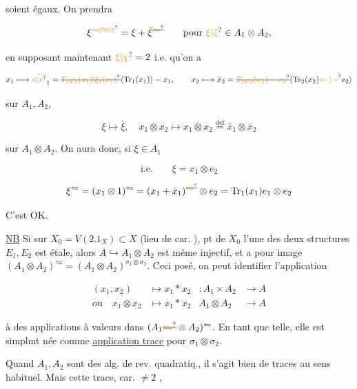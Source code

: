 soient égaux. On prendra



\[
\xi^{\unsure{\leftrightharpoons|\leftrightarrows|\natural}}=\xi+\bar\xi^{\deleted{\unsure{\leftrightharpoons}}}\qquad\text{pour }\unsure{\xi|\zeta}\in A_1\otimes A_2,
\]

en supposant maintenant $\unsure{\xi|\chi}=2$ i.e. qu'on a

\[
x_1\longmapsto\bar{\unsure{a|x}}_1=
\deleted{\unsure{T_1\varphi_1(x_1)|\xi_1(x_1)}}\inserted{\mathrm{Tr}_1(x_1)}-x_1,\qquad
x_2\longmapsto\bar x_2=\deleted{\unsure{T_2\varphi_2(x_2)-x_2}}
\inserted{\mathrm{Tr}_2(x_2)\unsure{\leftarrow|-}e_2}
\]

sur $A_1,A_2$, 

\[
\xi\longmapsto\bar\xi,\quad
x_1\otimes x_2\longmapsto\overline{x_1\otimes x_2}
\overset{\mathrm{def}}{=}\bar x_1\otimes\bar x_2
\]

sur $A_1\otimes A_2$. On aura donc, si $\xi\in A_1$

\[
\text{i.e.}\qquad \xi=x_1\otimes e_2
\]

\[
\xi^{\leftrightharpoons}=(x_1\otimes1)^{\leftrightharpoons}=(x_1+\bar x_1)^{\deleted{\unsure{\leftrightharpoons}}}\otimes e_2
=\mathrm{Tr}_1(x_1)e_1\otimes e_2
\]

C'est OK.

\uline{NB} Si  sur $X_0=V(2.1_X)\subset X$ (lieu de car. ),   pt de $X_0$ l'une des deux structures $E_1,E_2$ est étale, alors $A\hookrightarrow A_1\otimes A_2$ est même injectif, et a pour image $(A_1\otimes A_2)^{\leftrightharpoons}=(A_1\otimes A_2)^{\sigma_1\otimes\sigma_2}$. Ceci posé, on peut  identifier l'application

\[
\begin{aligned}
(x_1,x_2)&\longmapsto x_1*x_2 &: A_1\times A_2&\longrightarrow A\\
\text{ou}\quad x_1\otimes x_2&\longmapsto x_1*x_2 & A_1\otimes A_2&\longrightarrow A
\end{aligned}
\]

à des applications à valeurs dans $(A_1\deleted{\unsure{\leftrightharpoons}}\otimes A_2)^{\leftrightharpoons}$. En tant que telle, elle est simplmt née comme \uline{application trace} pour $\sigma_1\otimes\sigma_2$.

Quand $A_1,A_2$ sont des alg. de rev. quadratiq., il s'agit bien de traces au sens habituel. Mais cette trace,  car. $\ne2$ ,


